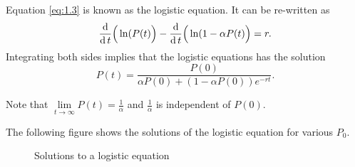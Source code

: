 \begin{example}
  Equation \ref{eq:1.3} is known as the logistic equation. It can be re-written as
  $$
    \frac{\operatorname{d}}{\operatorname{d} t}\Big(\ln(P(t)\Big)-\frac{\operatorname{d}}{\operatorname{d} t}\Big(\ln(1-\alpha P(t)\Big)=r.
  $$
  Integrating both sides implies that the logistic equations has the solution
  $$
    P(t)=\dfrac{P(0)}{\alpha P(0)+(1-\alpha P(0))e^{-rt}}.
  $$

  Note that $\lim\limits_{t\to\infty}P(t)=\frac{1}{\alpha}$ and $\frac{1}{\alpha}$ is independent of $P(0)$.

  The following figure shows the solutions of the logistic equation for various $P_0$.
  \begin{figure}[hbt!]
    \centering
    \caption{Solutions to a logistic equation}
  \end{figure}
\end{example}


